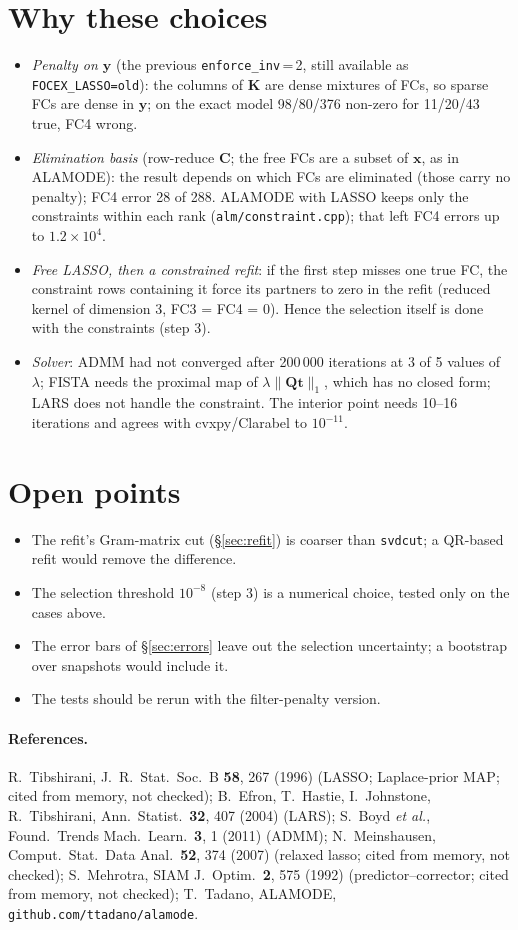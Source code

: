 \documentclass[11pt,a4paper]{article}
\newcommand{\bC}{\mathbf C}
\newcommand{\bK}{\mathbf K}
\newcommand{\bQ}{\mathbf Q}
\newcommand{\bt}{\mathbf t}
\newcommand{\bx}{\mathbf x}
\newcommand{\by}{\mathbf y}
\newcommand{\code}[1]{\texttt{#1}}
\begin{document}
\section{Why these choices}\label{sec:why}
\begin{itemize}
\item \emph{Penalty on $\by$} (the previous \code{enforce\_inv}\,=\,2, still available as \code{FOCEX\_LASSO=old}): the columns of $\bK$ are dense
mixtures of FCs, so sparse FCs are dense in $\by$; on the exact model 98/80/376 non-zero for 11/20/43 true, FC4 wrong.
\item \emph{Elimination basis} (row-reduce $\bC$; the free FCs are a subset of $\bx$, as in ALAMODE): the result depends on which FCs
are eliminated (those carry no penalty); FC4 error 28 of 288. ALAMODE with LASSO keeps only the constraints within each
rank (\code{alm/constraint.cpp}); that left FC4 errors up to $1.2\times10^4$.
\item \emph{Free LASSO, then a constrained refit}: if the first step misses one true FC, the constraint rows containing it force its
partners to zero in the refit (reduced kernel of dimension 3, FC3 = FC4 = 0). Hence the selection itself is done with the
constraints (step 3).
\item \emph{Solver}: ADMM had not converged after 200\,000 iterations at 3 of 5 values of $\lambda$; FISTA needs the proximal map of
$\lambda\|\bQ\bt\|_1$, which has no closed form; LARS does not handle the constraint. The interior point needs 10--16
iterations and agrees with cvxpy/Clarabel to $10^{-11}$.
\end{itemize}

\section{Open points}
\begin{itemize}
\item The refit's Gram-matrix cut (\S\ref{sec:refit}) is coarser than \code{svdcut}; a QR-based refit would remove the difference.
\item The selection threshold $10^{-8}$ (step 3) is a numerical choice, tested only on the cases above.
\item The error bars of \S\ref{sec:errors} leave out the selection uncertainty; a bootstrap over snapshots would include it.
\item The tests should be rerun with the filter-penalty version.
\end{itemize}

\paragraph{References.}
R.~Tibshirani, J.\ R.\ Stat.\ Soc.\ B \textbf{58}, 267 (1996) (LASSO; Laplace-prior MAP; cited from memory, not checked);
B.~Efron, T.~Hastie, I.~Johnstone, R.~Tibshirani, Ann.\ Statist.\ \textbf{32}, 407 (2004) (LARS);
S.~Boyd \emph{et al.}, Found.\ Trends Mach.\ Learn.\ \textbf{3}, 1 (2011) (ADMM);
N.~Meinshausen, Comput.\ Stat.\ Data Anal.\ \textbf{52}, 374 (2007) (relaxed lasso; cited from memory, not checked);
S.~Mehrotra, SIAM J.\ Optim.\ \textbf{2}, 575 (1992) (predictor--corrector; cited from memory, not checked);
T.~Tadano, ALAMODE, \code{github.com/ttadano/alamode}.
\end{document}

